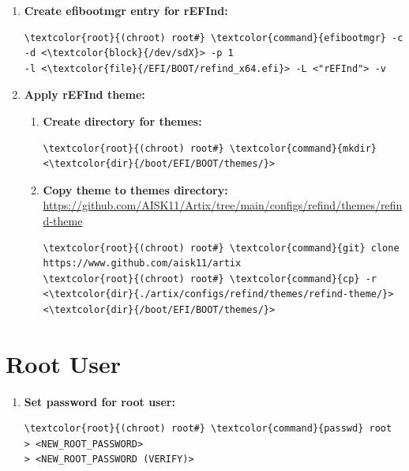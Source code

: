 \documentclass[10pt, a4paper, onecolumn, oneside, titlepage, openany]{book}
\begin{document}
\begin{enumerate}
\begin{Verbatim}[commandchars=\\\{\}]
menuentry "Artix" \{
    #volume  "ESP"
    icon    /EFI/BOOT/themes/refind-theme/icons/128-48/os_artix.png
    loader  /EFI/artix/vmlinuz-linux
    options "initrd=/EFI/artix/intel-ucode.img \char92
    initrd=/EFI/artix/initramfs-linux.img rw root=/dev/mapper/luks-root quiet"
    submenuentry "Debug" \{
        options "initrd=/EFI/artix/intel-ucode.img \char92
        initrd=/EFI/artix/initramfs-linux.img rw root=/dev/mapper/luks-root \char92
        rd.debug"
    \}
    #disabled
\}
\end{Verbatim}
    \item \textbf{Create efibootmgr entry for rEFInd:}
\begin{Verbatim}[commandchars=\\\{\}]
\textcolor{root}{(chroot) root#} \textcolor{command}{efibootmgr} -c -d <\textcolor{block}{/dev/sdX}> -p 1
-l <\textcolor{file}{/EFI/BOOT/refind_x64.efi}> -L <"rEFInd"> -v
\end{Verbatim}
    \item \textbf{Apply rEFInd theme:}
    \begin{enumerate}
        \item \textbf{Create directory for themes:}
\begin{Verbatim}[commandchars=\\\{\}]
\textcolor{root}{(chroot) root#} \textcolor{command}{mkdir} <\textcolor{dir}{/boot/EFI/BOOT/themes/}>
\end{Verbatim}
        \item \textbf{Copy theme to themes directory:}
\newline \url{https://github.com/AISK11/Artix/tree/main/configs/refind/themes/refind-theme}
\begin{Verbatim}[commandchars=\\\{\}]
\textcolor{root}{(chroot) root#} \textcolor{command}{git} clone https://www.github.com/aisk11/artix
\textcolor{root}{(chroot) root#} \textcolor{command}{cp} -r <\textcolor{dir}{./artix/configs/refind/themes/refind-theme/}>
<\textcolor{dir}{/boot/EFI/BOOT/themes/}>
\end{Verbatim}
    \end{enumerate}
\end{enumerate}

\section{Root User}
\begin{enumerate}
    \item \textbf{Set password for root user:}
\begin{Verbatim}[commandchars=\\\{\}]
\textcolor{root}{(chroot) root#} \textcolor{command}{passwd} root
> <NEW_ROOT_PASSWORD>
> <NEW_ROOT_PASSWORD (VERIFY)>
\end{Verbatim}
\end{enumerate}
\end{document}
